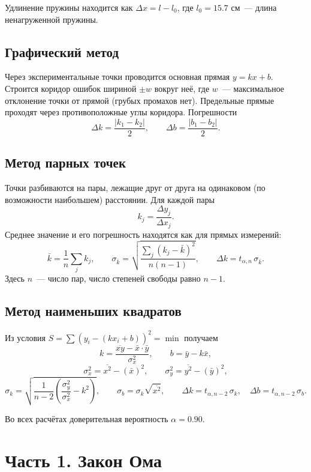 \documentclass[12pt]{article}
\begin{document}
    Удлинение пружины находится как $\varDelta x = l - l_0$, где $l_0 = 15.7$ см~--- длина ненагруженной пружины.

    \subsection{Графический метод}

    Через экспериментальные точки проводится основная прямая $y = k x + b$. Строится коридор ошибок шириной $\pm w$ вокруг неё, где $w$~--- максимальное отклонение точки от прямой (грубых промахов нет). Предельные прямые проходят через противоположные углы коридора. Погрешности
    \[
    	\varDelta k = \frac{|k_1 - k_2|}{2}, \qquad \varDelta b = \frac{|b_1 - b_2|}{2}.
    \]

    \subsection{Метод парных точек}

    Точки разбиваются на пары, лежащие друг от друга на одинаковом (по возможности наибольшем) расстоянии. Для каждой пары
    \[
    	k_j = \frac{\varDelta y_j}{\varDelta x_j}.
    \]
    Среднее значение и его погрешность находятся как для прямых измерений:
    \[
    	\bar k = \frac{1}{n}\sum_j k_j, \qquad
    	\sigma_{\bar k} = \sqrt{\frac{\sum_j (k_j - \bar k)^2}{n(n - 1)}}, \qquad
    	\varDelta k = t_{\alpha, n}\,\sigma_{\bar k}.
    \]
    Здесь $n$~--- число пар, число степеней свободы равно $n - 1$.

    \subsection{Метод наименьших квадратов}

    Из условия $S = \sum (y_i - (k x_i + b))^2 = \min$ получаем
    \[
    	k = \frac{\overline{xy} - \bar x \cdot \bar y}{\sigma_x^2}, \qquad
    	b = \bar y - k \bar x,
    \]
    \[
    	\sigma_x^2 = \overline{x^2} - (\bar x)^2, \qquad
    	\sigma_y^2 = \overline{y^2} - (\bar y)^2,
    \]
    \[
    	\sigma_k = \sqrt{\frac{1}{n - 2}\left(\frac{\sigma_y^2}{\sigma_x^2} - k^2\right)}, \qquad
    	\sigma_b = \sigma_k \sqrt{\overline{x^2}}, \qquad
    	\varDelta k = t_{\alpha, n - 2}\,\sigma_k, \quad \varDelta b = t_{\alpha, n - 2}\,\sigma_b.
    \]

    Во всех расчётах доверительная вероятность $\alpha = 0.90$.

    \section{Часть 1. Закон Ома}
\end{document}
